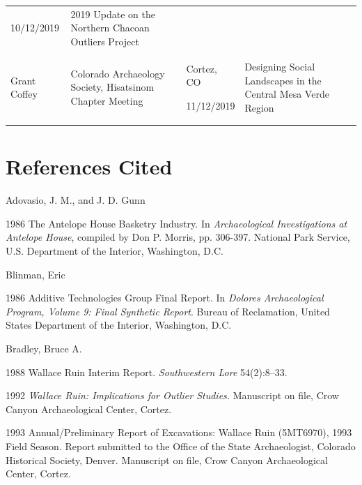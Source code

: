 \documentclass[
  12pt,
]{krantz}
\begin{document}
\begin{longtable}[]{@{}llll@{}}
\begin{minipage}[t]{0.21\columnwidth}
10/12/2019\strut
\end{minipage} & \begin{minipage}[t]{0.21\columnwidth}\raggedright
2019 Update on
the Northern
Chacoan
Outliers
Project\strut
\end{minipage}\tabularnewline
\begin{minipage}[t]{0.21\columnwidth}\raggedright
Grant Coffey\strut
\end{minipage} & \begin{minipage}[t]{0.21\columnwidth}\raggedright
Colorado
Archaeology
Society,
Hisatsinom
Chapter
Meeting\strut
\end{minipage} & \begin{minipage}[t]{0.21\columnwidth}\raggedright
Cortez, CO

11/12/2019\strut
\end{minipage} & \begin{minipage}[t]{0.21\columnwidth}\raggedright
Designing
Social
Landscapes in
the Central
Mesa Verde
Region\strut
\end{minipage}\tabularnewline
\bottomrule
\end{longtable}

\hypertarget{references-cited}{%
\chapter{References Cited}\label{references-cited}}

Adovasio, J. M., and J. D. Gunn

1986 The Antelope House Basketry Industry. In \emph{Archaeological
Investigations at Antelope House}, compiled by Don P. Morris, pp.
306-397. National Park Service, U.S. Department of the Interior,
Washington, D.C.

Blinman, Eric

1986 Additive Technologies Group Final Report. In \emph{Dolores
Archaeological Program, Volume 9: Final Synthetic Report}. Bureau of
Reclamation, United States Department of the Interior, Washington, D.C.

Bradley, Bruce A.

1988 Wallace Ruin Interim Report. \emph{Southwestern Lore} 54(2):8--33.

1992 \emph{Wallace Ruin: Implications for Outlier Studies.} Manuscript on
file, Crow Canyon Archaeological Center, Cortez.

1993 Annual/Preliminary Report of Excavations: Wallace Ruin (5MT6970),
1993 Field Season. Report submitted to the Office of the State
Archaeologist, Colorado Historical Society, Denver. Manuscript on file,
Crow Canyon Archaeological Center, Cortez.
\end{document}
